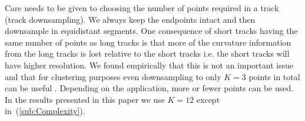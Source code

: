 \documentclass[preprint,authoryear,a4paper,10pt,onecolumn]{elsarticle}
\begin{document}
Care needs to be given to choosing the number of points required in a
track (track downsampling). We always keep the endpoints intact and then
downsample in equidistant segments. One consequence of short tracks
having the same number of points as long tracks is that more of the
curvature information from the long tracks is lost relative to the short
tracks i.e. the short tracks will have higher resolution.  We found
empirically that this is not an important issue and that for clustering
purposes even downsampling to only $K=3$ points in total can be useful
\citep{EGMB10}. Depending on the application, more or fewer points can
be used. In the results presented in this paper we use $K=12$ except
in~(\ref{sub:Complexity}).



\end{document}
